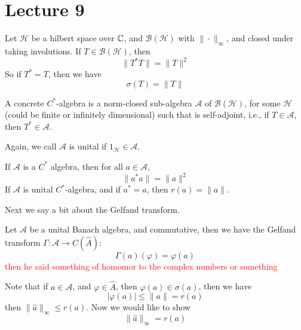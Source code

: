 \section{Lecture 9}
Let $\mathcal{H}$ be a hilbert space over $\mathbb{C}$, and $\mathcal{B}(\mathcal{H})$ with $\|\cdot\|_\infty$, and closed under taking involutions. If $T\in\mathcal{B}(\mathcal{H})$, then
\begin{equation*}
    \|T^*T\|=\|T\|^2
\end{equation*}
So if $T^*=T$, then we have
\begin{equation*}
    \sigma(T)=\|T\|
\end{equation*}

\begin{definition}
    A concrete $C^*$-algebra is a norm-closed sub-algebra $\mathcal{A}$ of $\mathcal{B}(\mathcal{H})$, for some $\mathcal{H}$ (could be finite or infinitely dimensional) such that is self-adjoint, i.e., if $T\in\mathcal{A}$, then $T^*\in\mathcal{A}$.

    Again, we call $\mathcal{A}$ is unital if $1_\mathcal{H}\in\mathcal{A}$. 
\end{definition}

\begin{corollary}
    If $\mathcal{A}$ is a $C^*$ algebra, then for all $a\in\mathcal{A}$,
    \begin{equation*}
        \|a^*a\|=\|a\|^2
    \end{equation*}
    If $\mathcal{A}$ is unital $C^*$-algebra, and if $a^*=a$, then $r(a)=\|a\|$.
\end{corollary}

Next we say a bit about the Gelfand transform.
\begin{definition}
    Let $\mathcal{A}$ be a unital Banach algebra, and commutative, then we have the Gelfand transform $\Gamma:\mathcal{A}\to C(\widehat{A})$:
    \begin{equation*}
        \Gamma(a)(\varphi)=\varphi(a)
    \end{equation*}
    \textcolor{red}{then he said something of homomor to the complex numbers or something}
\end{definition}

Note that if $a\in\mathcal{A}$, and $\varphi\in\widehat{A}$, then $\varphi(a)\in\sigma(a)$, then we have
\begin{equation*}
    |\varphi(a)|\leq\|a\|=r(a)
\end{equation*}
then $\|\widehat{a}\|_\infty\leq r(a)$. Now we would like to show
\begin{equation*}
    \|\widehat{a}\|_\infty=r(a)
\end{equation*}

